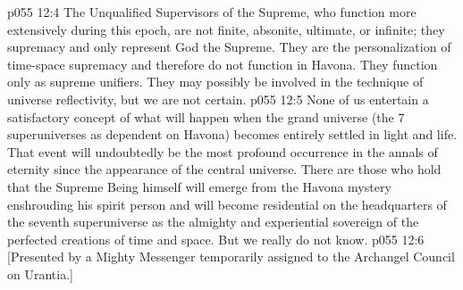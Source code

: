 \vs p055 12:4 The Unqualified Supervisors of the Supreme, who function more extensively during this epoch, are not finite, absonite, ultimate, or infinite; they  supremacy and only represent God the Supreme. They are the personalization of time\hyp{}space supremacy and therefore do not function in Havona. They function only as supreme unifiers. They may possibly be involved in the technique of universe reflectivity, but we are not certain.
\vs p055 12:5 \pc None of us entertain a satisfactory concept of what will happen when the grand universe (the 7 superuniverses as dependent on Havona) becomes entirely settled in light and life. That event will undoubtedly be the most profound occurrence in the annals of eternity since the appearance of the central universe. There are those who hold that the Supreme Being himself will emerge from the Havona mystery enshrouding his spirit person and will become residential on the headquarters of the seventh superuniverse as the almighty and experiential sovereign of the perfected creations of time and space. But we really do not know.
\vsetoff
\vs p055 12:6 [Presented by a Mighty Messenger temporarily assigned to the Archangel Council on Urantia.]
\quizlink

